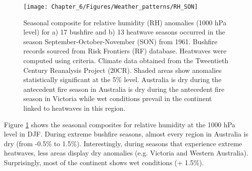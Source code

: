 \begin{figure}[h]
\noindent \begin{centering}
\texttt{[image: Chapter\_6/Figures/Weather\_patterns/RH\_SON]}
\par\end{centering}

\caption[Seasonal composite for relative humidity (RH) anomalies (1000 hPa
level) for a) 17 bushfire and b) 13 heatwave seasons occurred in the
season September-October-November (SON) from 1961]{Seasonal composite for relative humidity (RH) anomalies (1000 hPa
level) for a) 17 bushfire and b) 13 heatwave seasons occurred in the
season September-October-November (SON) from 1961.
Bushfire records sourced from Risk Frontiers (RF) database. Heatwaves
were computed using \citet{Pezza2012} criteria. Climate data obtained
from the Tweentieth Century Reanalysis Project (20CR). Shaded areas
show anomalies statistically significant at the 5\% level. Australia
is dry during the antecedent fire season in Australia is dry during
the antecedent fire season in Victoria while wet conditions prevail
in the continent linked to heatwaves in this region.\label{fig:Relative humidity anomalies (1000 hPa level) of bushfire and heatwave seasons in September-October-November for the period 1961=0020132011 (r)}}
\end{figure}


Figure \ref{fig:Relative humidity anomalies (1000 hPa level) of bushfire and heatwave seasons in September-October-November for the period 1961=0020132011 (r)}
shows the seasonal composites for relative humidity at the 1000 hPa
level in DJF. During extreme bushfire seasons, almost every region
in Australia is dry (from -0.5\% to 1.5\%). Interestingly, during
seasons that experience extreme heatwaves, less areas display dry
anomalies (e.g. Victoria and Western Australia). Surprisingly, most
of the continent shows wet conditions (+ 1.5\%). 

